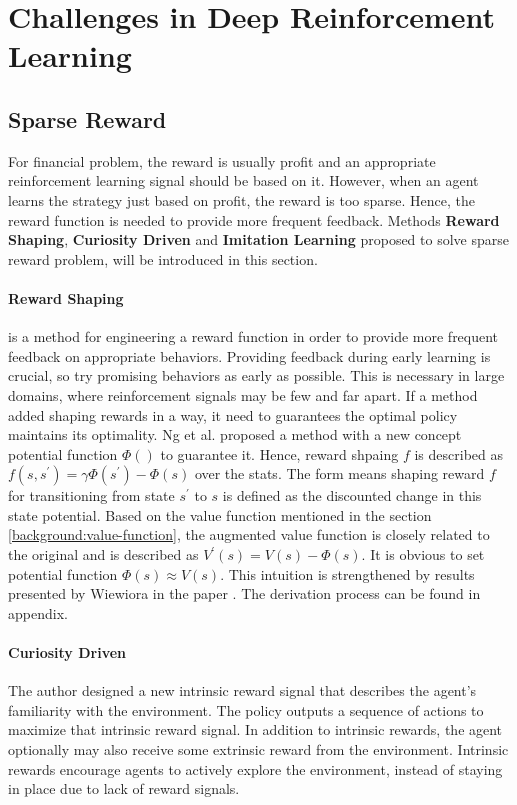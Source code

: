 \section{Challenges in Deep Reinforcement Learning}

\subsection{Sparse Reward} \label{related-work:sparse-reward}
For financial problem, the reward is usually profit and an appropriate reinforcement learning signal should be based on it. However, when an agent learns the strategy just based on profit, the reward is too sparse. Hence, the reward function is needed to provide more frequent feedback. Methods \textbf{Reward Shaping},\textbf{ Curiosity Driven} and \textbf{Imitation Learning} proposed to solve sparse reward problem, will be introduced in this section.

\paragraph{Reward Shaping\parencite{Wiewiora2010}} is a method for engineering a reward function in order to provide more frequent feedback on appropriate behaviors. Providing feedback during early learning is crucial, so try promising behaviors as early as possible. This is necessary in large domains, where reinforcement signals may be few and far apart. If a method added shaping rewards in a way, it need to guarantees the optimal policy maintains its optimality. Ng et al. proposed a method with a new concept potential function $\Phi()$ to guarantee it. Hence, reward shpaing $f$ is described as $f(s, s^{\prime}) = \gamma\Phi(s^{\prime}) - \Phi(s)$ over the stats\parencite{Ng1999PolicyIU}. The form means shaping reward $f$ for transitioning from state $s^{\prime}$ to $s$ is defined as the discounted change in this state potential. Based on the value function mentioned in the section \ref{background:value-function}, the augmented value function is closely related to the original and is described as $V^{\prime}(s) = V(s) - \Phi(s)$. It is obvious to set potential function $\Phi(s) \approx V(s)$. This intuition is strengthened by results presented by Wiewiora in the paper \parencite{Wiewiora2003}. The derivation process can be found in appendix.

 
\paragraph{Curiosity Driven \parencite{pathakICMl17curiosity}} The author designed a new intrinsic reward signal that describes the agent’s familiarity with the environment. The policy outputs a sequence of actions to maximize that intrinsic reward signal. In addition to intrinsic rewards, the agent optionally may also receive some extrinsic reward from the environment. Intrinsic rewards encourage agents to actively explore the environment, instead of staying in place due to lack of reward signals.


